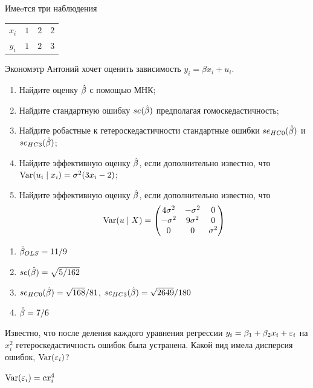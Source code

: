 \begin{problem}
  Имеeтся три наблюдения

  \begin{tabular}{cccc}
    \toprule
  $x_i$ & $1$ & $2$ & $2$ \\
  $y_i$ & $1$ & $2$ & $3$ \\
\bottomrule
  \end{tabular}

  Экономэтр Антоний хочет оценить зависимость $y_i = \beta x_i + u_i$.

  \begin{enumerate}
    \item Найдите оценку $\hat{\beta}$ с помощью МНК;
    \item Найдите стандартную ошибку $se(\hat{\beta})$ предполагая гомоскедастичность;
    \item Найдите робастные к гетероскедастичности стандартные ошибки $se_{HC0}(\hat{\beta})$ и $se_{HC3}(\hat{\beta})$;
    \item Найдите эффективную оценку $\hat{\beta}$, если дополнительно известно, что $\operatorname{Var}(u_i \mid x_i)=\sigma^2(3x_i-2)$;
    \item Найдите эффективную оценку $\hat{\beta}$, если дополнительно известно, что
      \[
    \operatorname{Var}(u \mid X) = \begin{pmatrix}
      4 \sigma^2 & -\sigma^2 & 0 \\
      -\sigma^2 & 9\sigma^2 & 0 \\
      0 & 0 & \sigma^2 \\
    \end{pmatrix}
  \]
  \end{enumerate}

\begin{sol}
\begin{enumerate}
\item $\hat{\beta}_{OLS} = 11/9$
\item $se(\hat{\beta}) = \sqrt{5/162}$
\item $se_{HC0}(\hat{\beta}) = \sqrt{168}/81$, $se_{HC3}(\hat{\beta}) = \sqrt{2649}/180$
\item $\hat{\beta} = 7/6$
\end{enumerate}
\end{sol}
\end{problem}


\begin{problem}
Известно, что после деления каждого уравнения регрессии $y_i = \beta_1 + \beta_2 x_i + \varepsilon_i$ на $x_i^2$ гетероскедастичность ошибок была устранена. Какой вид имела дисперсия ошибок, $\operatorname{Var}(\varepsilon_i)$?

\begin{sol}
$\operatorname{Var}(\varepsilon_i)=cx_i^4$
\end{sol}
\end{problem}



